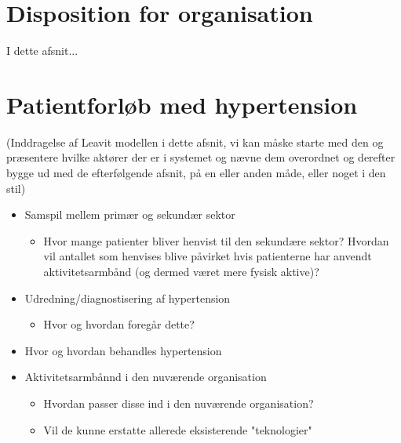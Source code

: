 \section{Disposition for organisation}

I dette afsnit...

\section{Patientforløb med hypertension}
(Inddragelse af Leavit modellen i dette afsnit, vi kan måske starte med den og præsentere hvilke aktører der er i systemet og nævne dem overordnet og derefter bygge ud med de efterfølgende afsnit, på en eller anden måde, eller noget i den stil)
\begin{itemize}
\item Samspil mellem primær og sekundær sektor
\begin{itemize}
\item Hvor mange patienter bliver henvist til den sekundære sektor? Hvordan vil antallet som henvises blive påvirket hvis patienterne har anvendt aktivitetsarmbånd (og dermed været mere fysisk aktive)?
\end{itemize}
\item Udredning/diagnostisering af hypertension
\begin{itemize}
\item Hvor og hvordan foregår dette?
\end{itemize}
\item Hvor og hvordan behandles hypertension
\item Aktivitetsarmbånnd i den nuværende organisation
\begin{itemize}
\item Hvordan passer disse ind i den nuværende organisation? 
\item Vil de kunne erstatte allerede eksisterende "teknologier"
\end{itemize}
\end{itemize}

